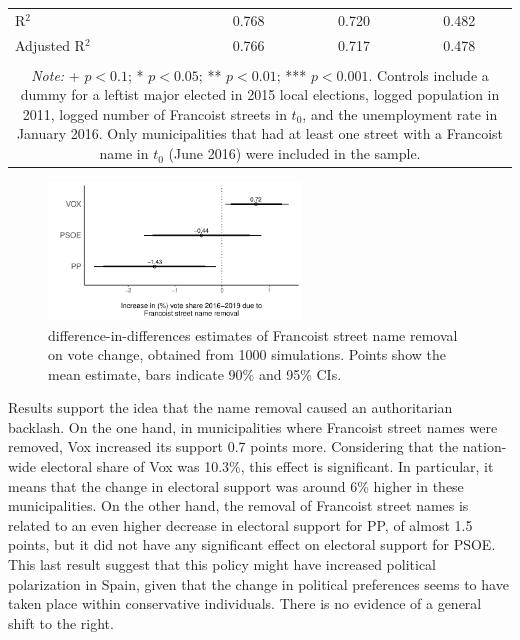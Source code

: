 \documentclass[12pt, notitlepage]{article}
\begin{document}
\begin{table}[!htbp]
\begin{tabular}{lccc}
  R$^{2}$ & \multicolumn{1}{c}{0.768} & \multicolumn{1}{c}{0.720} & \multicolumn{1}{c}{0.482} \\
  Adjusted R$^{2}$ & \multicolumn{1}{c}{0.766} & \multicolumn{1}{c}{0.717} & \multicolumn{1}{c}{0.478} \\
  \hline
  \hline \\[-1.8ex]
  \multicolumn{4}{c}{\parbox[t]{0.75\textwidth}{\textit{Note:} + $p<0.1$; * $p<0.05$; ** $p<0.01$; *** $p<0.001$. Controls include a dummy for a leftist major elected in 2015 local elections, logged population in 2011, logged number of Francoist streets in $t_{0}$, and the unemployment rate in January 2016. Only municipalities that had at least one street with a Francoist name in $t_{0}$ (June 2016) were included in the sample.}} \\
  \end{tabular}
\end{table}

\begin{figure}[htb!]
\centering

  \includegraphics[width = 0.6\textwidth]{../output/DiD_estimates}

  \caption{difference-in-differences estimates of Francoist street name removal on vote change, obtained from 1000 simulations. Points show the mean estimate, bars indicate 90\% and 95\% CIs.}\label{fig:main_DiD}

\end{figure}

Results support the idea that the name removal caused an authoritarian backlash.
On the one hand, in municipalities where Francoist street names were removed, Vox increased its support 0.7 points more.
Considering that the nation-wide electoral share of Vox was 10.3\%, this effect is significant.
In particular, it means that the change in electoral support was around 6\% higher in these municipalities.
On the other hand, the removal of Francoist street names is related to an even higher decrease in electoral support for PP, of almost 1.5 points, but it did not have any significant effect on electoral support for PSOE.
This last result suggest that this policy might have increased political polarization in Spain, given that the change in political preferences seems to have taken place within conservative individuals.
There is no evidence of a general shift to the right.
\end{document}
